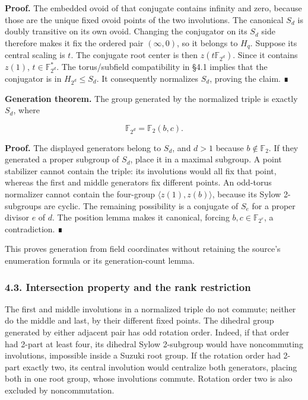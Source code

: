 \documentclass[
  11pt,
  a4paper,
]{article}
\begin{document}
\textbf{Proof.} The embedded ovoid of that conjugate contains infinity
and zero, because those are the unique fixed ovoid points of the two
involutions. The canonical \(S_d\) is doubly transitive on its own
ovoid. Changing the conjugator on its \(S_d\) side therefore makes it
fix the ordered pair \((\infty,0)\), so it belongs to \(H_q\). Suppose
its central scaling is \(t\). The conjugate root center is then
\(z(t\mathbb F_{2^d})\). Since it contains \(z(1)\),
\(t\in\mathbb F_{2^d}^*\). The torus/subfield compatibility in §4.1
implies that the conjugator is in \(H_{2^d}\le S_d\). It consequently
normalizes \(S_d\), proving the claim. ∎

\textbf{Generation theorem.} The group generated by the normalized
triple is exactly \(S_d\), where

\[\mathbb F_{2^d}=\mathbb F_2(b,c).\]

\textbf{Proof.} The displayed generators belong to \(S_d\), and \(d>1\)
because \(b\notin\mathbb F_2\). If they generated a proper subgroup of
\(S_d\), place it in a maximal subgroup. A point stabilizer cannot
contain the triple: its involutions would all fix that point, whereas
the first and middle generators fix different points. An odd-torus
normalizer cannot contain the four-group \(\langle z(1),z(b)\rangle\),
because its Sylow 2-subgroups are cyclic. The remaining possibility is a
conjugate of \(S_e\) for a proper divisor \(e\) of \(d\). The position
lemma makes it canonical, forcing \(b,c\in\mathbb F_{2^e}\), a
contradiction. ∎

This proves generation from field coordinates without retaining the
source's enumeration formula or its generation-count lemma.

\subsubsection{4.3. Intersection property and the rank
restriction}\label{intersection-property-and-the-rank-restriction}

The first and middle involutions in a normalized triple do not commute;
neither do the middle and last, by their different fixed points. The
dihedral group generated by either adjacent pair has odd rotation order.
Indeed, if that order had 2-part at least four, its dihedral Sylow
2-subgroup would have noncommuting involutions, impossible inside a
Suzuki root group. If the rotation order had 2-part exactly two, its
central involution would centralize both generators, placing both in one
root group, whose involutions commute. Rotation order two is also
excluded by noncommutation.
\end{document}
